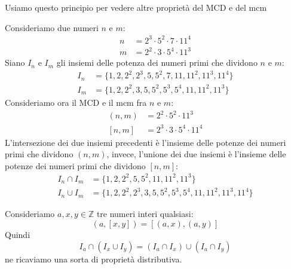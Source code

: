Usiamo questo principio per vedere altre propriet\`a del MCD e del mcm

\begin{example}
	Consideriamo due numeri $n$ e $m$:
	\begin{equation*}
		\begin{array}{ll}
			n & = 2^3 \cdot 5^2 \cdot 7 \cdot 11^4 \\
			m & = 2^2 \cdot 3 \cdot 5^4 \cdot 11^3
		\end{array}
	\end{equation*}
	Siano $I_n$ e $I_m$ gli insiemi delle potenza dei numeri primi che dividono $n$ e $m$:
	\begin{equation*}
		\begin{array}{ll}
			I_n & = \{ 1, 2, 2^2, 2^3, 5, 5^2, 7, 11, 11^2, 11^3, 11^4 \} \\
			I_m & = \{ 1, 2, 2^2, 3, 5, 5^2, 5^3, 5^4, 11, 11^2, 11^3 \}
		\end{array}
	\end{equation*}
	Consideriamo ora il MCD e il mcm fra $n$ e $m$:
	\begin{equation*}
		\begin{array}{ll}
			(n, m)              & = 2^2 \cdot 5^2 \cdot 11^3         \\
			\left[ n, m \right] & = 2^3 \cdot 3 \cdot 5^4 \cdot 11^4
		\end{array}
	\end{equation*}
	L'intersezione dei due insiemi precedenti \`e l'insieme delle potenze dei numeri primi
	che dividono $(n, m)$, invece, l'unione dei due insiemi \`e l'insieme delle potenze dei
	numeri primi che dividono $[n, m]$:
	\begin{equation*}
		\begin{array}{ll}
			I_n \cap I_m & = \{ 1, 2, 2^2, 5, 5^2, 11, 11^2, 11^3 \}                         \\
			I_n \cup I_m & = \{ 1, 2, 2^2, 2^3, 3, 5, 5^2, 5^3, 5^4, 11, 11^2, 11^3, 11^4 \}
		\end{array}
	\end{equation*}
\end{example}

\begin{theorem}
	Consideriamo $a, x, y \in \mathbb{Z}$ tre numeri interi qualsiasi:
	\begin{equation*}
		(a, [x, y]) = [(a, x), (a, y)]
	\end{equation*}
	Quindi
	\begin{equation*}
		I_a \cap (I_x \cup I_y) = (I_a \cap I_x) \cup (I_a \cap I_y)
	\end{equation*}
	ne ricaviamo una sorta di propriet\`a distributiva.
\end{theorem}

